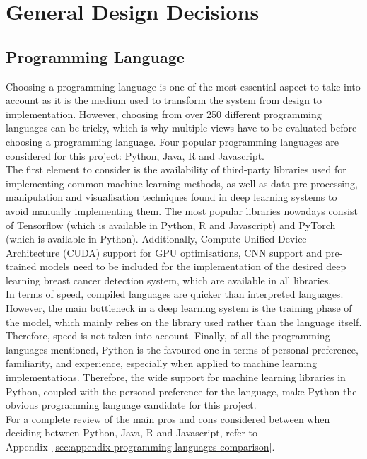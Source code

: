\section{General Design Decisions}

\subsection{Programming Language}

Choosing a programming language is one of the most essential aspect to take into account as it is the medium used to transform the system from design to implementation. However, choosing from over 250 different programming languages \citep{tiobe} can be tricky, which is why multiple views have to be evaluated before choosing a programming language. Four popular programming languages are considered for this project: Python, Java, R and  Javascript.\\

The first element to consider is the availability of third-party libraries used for implementing common machine learning methods, as well as data pre-processing, manipulation and visualisation techniques found in deep learning systems to avoid manually implementing them. The most popular libraries nowadays consist of Tensorflow (which is available in Python, R and Javascript) and PyTorch (which is available in Python). Additionally, Compute Unified Device Architecture (CUDA) support for GPU optimisations, CNN support and pre-trained models need to be included for the implementation of the desired deep learning breast cancer detection system, which are available in all libraries.\\

In terms of speed, compiled languages are quicker than interpreted languages. However, the main bottleneck in a deep learning system is the training phase of the model, which mainly relies on the library used rather than the language itself. Therefore, speed is not taken into account. Finally, of all the programming languages mentioned, Python is the favoured one in terms of personal preference, familiarity, and experience, especially when applied to machine learning implementations. Therefore, the wide support for machine learning libraries in Python, coupled with the personal preference for the language, make Python the obvious programming language candidate for this project.\\

For a complete review of the main pros and cons considered between when deciding between Python, Java, R and Javascript, refer to Appendix~\ref{sec:appendix-programming-languages-comparison}.

